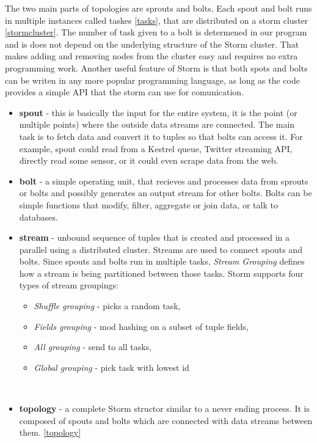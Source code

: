 \documentclass[journal]{IEEEtran/IEEEtran}
\begin{document}
The two main parts of topologies are sprouts and bolts. Each spout and bolt runs in multiple instances called taskes \ref{tasks}, that are distributed on a storm cluster \ref{stormcluster}. The number of task given to a bolt is determened in our program and is does not depend on the underlying structure of the Storm cluster. That makes adding and removing nodes from the cluster easy and requires no extra programming work. Another useful feature of Storm is that both spots and bolts can be writen in any more popular programming language, as long as the code provides a simple API that the storm can use for comunication. \\

\begin{itemize}
    \item \textbf{spout} - this is basically the input for the entire system, it is the point (or multiple points) where the outside data streams are connected. The main task is to fetch data and convert it to tuples so that bolts can access it. For example, spout could read from a Kestrel queue, Twitter streaming API, directly read some sensor, or it could even scrape data from the web.\\
    \item \textbf{bolt} - a simple operating unit, that recieves and processes data from sprouts or bolts and possibly generates an output stream for other bolts. Bolts can be simple functions that modify, filter, aggregate or join data, or talk to databases. \\
    \item \textbf{stream} - unbound sequence of tuples that is created and processed in a parallel using a distributed cluster. Streams are used to connect spouts and bolts. Since spouts and bolts run in multiple tasks, \textit{Stream Grouping} defines how a stream is being partitioned between those tasks. Storm supports four types of stream groupings:
        \begin{itemize}
            \item \textit{Shuffle grouping} - picks a random task, 
            \item \textit{Fields grouping} - mod hashing on a subset of tuple fields, 
            \item \textit{All grouping} - send to all tasks, 
            \item \textit{Global grouping} - pick task with lowest id
        \end{itemize} 
        \ \\
    \item \textbf{topology} - a complete Storm structor similar to a never ending process. It is composed of spouts and bolts which are connected with data streams between them. \ref{topology} \\
\end{itemize} 
\ \\
\end{document}
